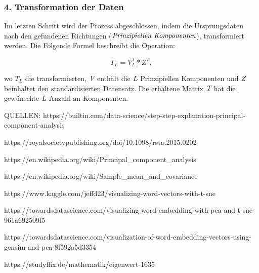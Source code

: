 \subsubsection{4. Transformation der Daten}
Im letzten Schritt wird der Prozess abgeschlossen, indem die Ursprungsdaten nach den gefundenen Richtungen ($\emph{Prinzipiellen Komponenten}$), transformiert werden. Die Folgende Formel beschreibt die Operation:

\begin{equation}\label{transPCA}
	T_{L} = V^T_L * Z^T,
\end{equation}  

wo $T_{L}$ die transformierten, $\emph{V}$ enthält die $\emph{L}$ Prinzipiellen Komponenten und $\emph{Z}$ beinhaltet den standardisierten Datensatz. Die erhaltene Matrix $\emph{T}$ hat die gewünschte $\emph{L}$ Anzahl an Komponenten. 


QUELLEN:
https://builtin.com/data-science/step-step-explanation-principal-component-analysis

https://royalsocietypublishing.org/doi/10.1098/rsta.2015.0202

https://en.wikipedia.org/wiki/Principal_component_analysis

https://en.wikipedia.org/wiki/Sample_mean_and_covariance

https://www.kaggle.com/jeffd23/visualizing-word-vectors-with-t-sne

https://towardsdatascience.com/visualizing-word-embedding-with-pca-and-t-sne-961a692509f5

https://towardsdatascience.com/visualization-of-word-embedding-vectors-using-gensim-and-pca-8f592a5d3354

https://studyflix.de/mathematik/eigenwert-1635



